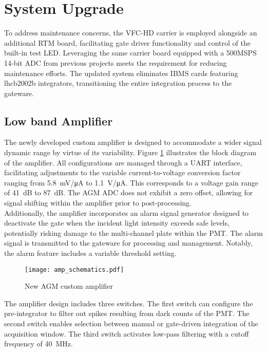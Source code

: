 \section{System Upgrade}
To address maintenance concerns, the VFC-HD carrier is employed alongside an
additional RTM board, facilitating gate driver functionality and control of the
built-in test LED. Leveraging the same carrier board equipped with a 500MSPS
14-bit ADC from previous projects meets the requirement for reducing
maintenance efforts. The updated system eliminates IBMS cards featuring
lhcb2002b integrators, transitioning the entire integration process to the
gateware.

\subsection{Low band Amplifier}
The newly developed custom amplifier is designed to accommodate a wider signal
dynamic range by virtue of its variability.
Figure \ref{fig:amp_schematics} illustrates the block diagram of the amplifier.
All configurations are managed through a UART interface, facilitating
adjustments to the variable current-to-voltage conversion factor ranging from
\SI{5.8}{mV/\micro A} to \SI{1.1}{V/\micro A}. This corresponds to a voltage
gain range of \SI{41}{dB} to \SI{87}{dB}. The AGM ADC does not exhibit a zero
offset, allowing for signal shifting within the amplifier prior to
post-processing.\\
Additionally, the amplifier incorporates an alarm signal generator designed to
deactivate the gate when the incident light intensity exceeds safe levels,
potentially risking damage to the multi-channel plate within the PMT. The alarm
signal is transmitted to the gateware for processing and management. Notably,
the alarm feature includes a variable threshold setting.
\begin{figure}[!tbh]
    \centering
    \texttt{[image: amp\_schematics.pdf]}
    \caption{New AGM custom amplifier}
    \label{fig:amp_schematics}
\end{figure}
The amplifier design includes three switches. The first switch can configure
the pre-integrator to filter out spikes resulting from dark counts of the PMT.
The second switch enables selection between manual or gate-driven integration
of the acquisition window. The third switch activates low-pass filtering with a
cutoff frequency of \SI{40}{MHz}.

